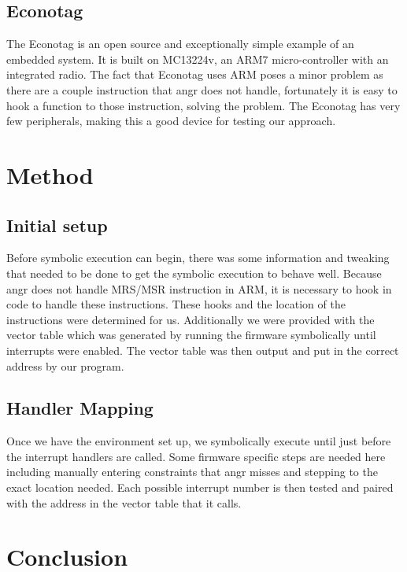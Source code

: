 \documentclass[letterpaper, 10 pt, conference]{ieeeconf}
\begin{document}
\subsection{Econotag} %
The Econotag is an open source and exceptionally simple example of an embedded system. It is built on MC13224v, an ARM7 micro-controller with an integrated radio. The fact that Econotag uses ARM poses a minor problem as there are a couple instruction that angr does not handle, fortunately it is easy to hook a function to those instruction, solving the problem. The Econotag has very few peripherals, making this a good device for testing our approach.

\section{Method}
\subsection{Initial setup}
Before symbolic execution can begin, there was some information and tweaking that needed to be done to get the symbolic execution to behave well. Because angr does not handle MRS/MSR instruction in ARM, it is necessary to hook in code to handle these instructions. These hooks and the location of the instructions were determined for us. Additionally we were provided with the vector table which was generated by running the firmware symbolically until interrupts were enabled. %
The vector table was then output and put in the correct address by our program. 

\subsection{Handler Mapping}
Once we have the environment set up, we symbolically execute until just before the interrupt handlers are called. Some firmware specific steps are needed here including manually entering constraints that angr misses and stepping to the exact location needed. Each possible interrupt number is then tested and paired with the address in the vector table that it calls.

\section{Conclusion}
\end{document}
